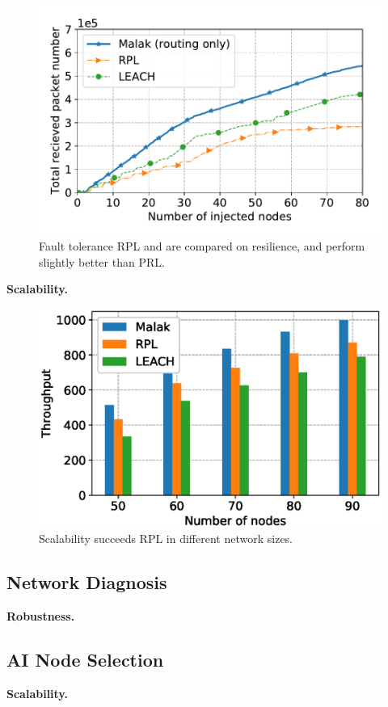 \begin{figure}[htbp]
	\centering
	\includegraphics[width=.85\columnwidth]{Figure/fault_tolerance}
	\vspace{-0.1in}
	\caption{Fault tolerance
		\textnormal{
			RPL and {\sdn} are compared on resilience, and {\sdn} perform
			slightly better than PRL.
		}}
	\label{fig:fault_tolerance}
\end{figure}

\textbf{Scalability.}
\begin{figure}[htbp]
	\centering
	\includegraphics[width=.85\columnwidth]{Figure/scalability}
	\vspace{-0.1in}
	\caption{Scalability
		\textnormal{
			{\sdn} succeeds RPL in different network sizes.
		}}
	\label{fig:scalability}
\end{figure}

\subsection{Network Diagnosis}
\textbf{Robustness.}

\subsection{AI Node Selection}
\textbf{Scalability.}

